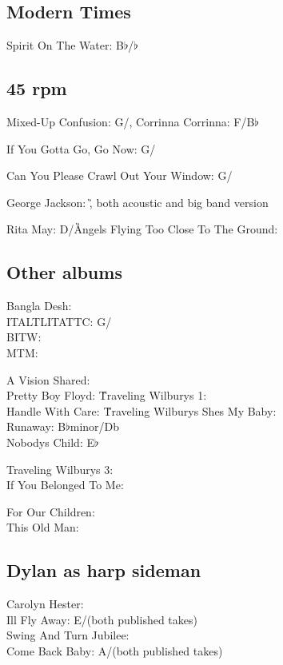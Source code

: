 \documentclass[a4paper,twoside]{memoir}
\begin{document}
\subsection{Modern Times}

Spirit On The Water: B$\flat$/\E$\flat$


\subsection*{45 rpm }

Mixed-Up Confusion: G/\C, Corrinna Corrinna: F/B$\flat$


If You Gotta Go, Go Now: G/\C


Can You Please Crawl Out Your Window: G/\C


George Jackson: \G, both acoustic and big band version


Rita May: D/\G


Angels Flying Too Close To The Ground: \A

\subsection*{Other albums}


Bangla Desh: \\ ITALTLITATTC: G/\C\\ BITW: \G\\ MTM: \E


A Vision Shared: \\ Pretty Boy Floyd: \G


Traveling Wilburys 1: \\ Handle With Care: \G


Traveling Wilburys Shes My Baby: \\ Runaway: B$\flat$minor/Db\\ Nobodys
Child: E$\flat$


Traveling Wilburys 3: \\ If You Belonged To Me: \D


For Our Children: \\ This Old Man: \C


\subsection{Dylan as harp sideman}

Carolyn Hester: \\ Ill Fly Away: E/\A (both published takes)\\ Swing
And Turn Jubilee: \G\\ Come Back Baby: A/\D (both published takes)
\end{document}
